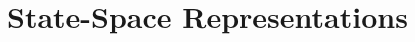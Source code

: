 \documentclass[12pt,letter]{article}
\begin{document}
	
%	

	\setcounter{section}{11}	
	\setcounter{figure}{\thesection}   
	\renewcommand\thefigure{\thesection.\arabic{figure}}
	\setcounter{equation}{\thesection}   
	\renewcommand\theequation{\thesection.\arabic{equation}}

\section{State-Space Representations}











	\pagebreak
	\renewcommand{\thepage}{}
	\renewcommand\refname{References Cited}
	\pagestyle{plain}
	
	
\end{document}
